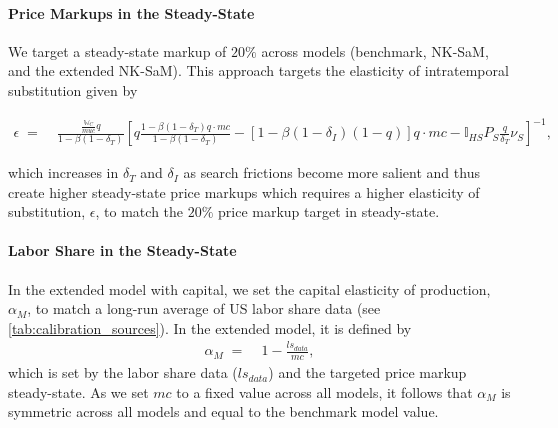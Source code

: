 \documentclass[12pt,3p,authoryear,review]{elsarticle}
\begin{document}
\begin{small}
\paragraph{Price Markups in the Steady-State}%
We target a steady-state markup of $20\%$ across models (benchmark, NK-SaM, and the extended NK-SaM). This approach targets the elasticity of intratemporal substitution given by%
\begin{footnotesize}%
	\begin{align}%
		\epsilon \; = & \; \frac{\frac{\mathbb{W}_C}{muc} q}{1-\beta\left(1-\delta_T\right)} \left[ q \frac{1-\beta\left(1-\delta_T\right) q \cdot mc}{1-\beta\left(1-\delta_T\right)}  - \left[1-\beta\left(1-\delta_I\right)(1-q)\right] q \cdot mc - \mathbb{I}_{HS} P_S \frac{q}{\delta_T} \nu_S \right]^{-1},%
	\end{align}%
\end{footnotesize}%
which increases in $\delta_T$ and $\delta_I$ as search frictions become more salient and thus create higher steady-state price markups which requires a higher elasticity of substitution, $\epsilon$, to match the $20\%$ price markup target in steady-state.%
\paragraph{Labor Share in the Steady-State}%
In the extended model with capital, we set the capital elasticity of production, $\alpha_M$, to match a long-run average of US labor share data (see \cref{tab:calibration_sources}). In the extended model, it is defined by%
\begin{align}%
	\alpha_M \; = & \; 1 - \frac{ls_{data}}{mc},%
\end{align}%
which is set by the labor share data ($ls_{data}$) and the targeted price markup steady-state. As we set $mc$ to a fixed value across all models, it follows that $\alpha_M$ is symmetric across all models and equal to the benchmark model value.%

\end{small}
\end{document}
